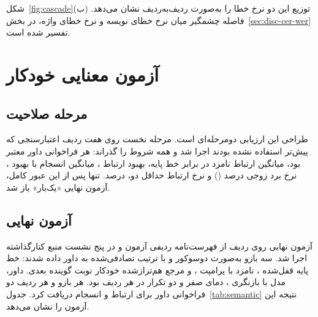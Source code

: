 شکل~\ref{fig:cascade}(ب) توزیع این دو نرخ خطا را به‌صورت ردیف‌به‌ردیف نشان
می‌دهد. فاصله چشمگیر میان نرخ خطای نویسه و نرخ خطای واژه، در
بخش~\ref{sec:disc-cer-wer} تفسیر شده است.


\section{آزمون معنایی خودکار}
\label{sec:res-semantic}

\subsection{مرحله صلاحیت}

طراحی این ارزیابی دو‌مرحله‌ای است. مرحله نخست روی هفت ردیف
اعتبارسنجی که پیش‌تر استفاده نشده بودند اجرا شد و همه شروط را گذراند:
هر  فراخوانی داور معتبر بود، میانگین ارتباط نامزد  در برابر
 خط پایه، بهبود ارتباط ، میانگین انسجام  با بهبود
، نرخ برد زوجی  درصد () و نرخ ارتباط حداقل دو،
 درصد. تنها پس از این عبور کامل، آزمون نهایی «یک‌بار» باز شد.

\subsection{آزمون نهایی}

آزمون نهایی روی  ردیف از فهرست‌نامه  ردیفی آزمون و در پنج
نشست منبع کنارگذاشته اجرا شد. سه بازو به‌صورت دوسوکور و با ترتیب
تصادفی‌شده به داور داده شدند: خط پایه قفل‌شده ، نامزد
 با پرامپت ، و مرجع هم‌ترازشده خودکار نوبت گوینده
بعدی. داور، مدل  با بازنگری
، دمای صفر و دو تکرار در هر
ردیف بود. هر بازو و هر ردیف دو فراخوانی داور برای ارتباط و انسجام دریافت
کرد. جدول~\ref{tab:semantic} نتیجه این آزمون را نشان می‌دهد.

